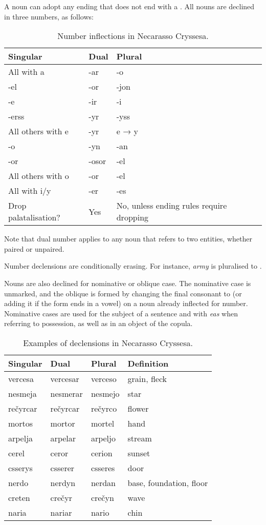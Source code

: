 \documentclass{book}
\begin{document}
A noun can adopt any ending that does not end with a . All nouns are declined in three numbers, as follows:

\begin{table}[H]
  \caption{Number inflections in Necarasso Cryssesa.}
  \centering
  \begin{tabu}{|X|X|X|}
    \hline
    Singular & Dual & Plural \\ \hline
    All with a & -ar & -o \\ \hline
    -el & -or & -jon \\
    -e & -ir & -i \\
    -erss & -yr & -yss \\
    All others with e & -yr & e → y \\ \hline
    -o & -yn & -an \\
    -or & -osor & -el \\
    All others with o & -or & -el \\ \hline
    All with i/y & -er & -es \\ \hline
   Drop palatalisation? & Yes & No, unless ending rules require dropping \\ \hline
  \end{tabu}
\end{table}

Note that dual number applies to any noun that refers to two entities, whether paired or unpaired.

Number declensions are conditionally erasing. For instance,  \emph{army} is pluralised to .

Nouns are also declined for nominative or oblique case. The nominative case is unmarked, and the oblique is formed by changing the final consonant to  (or adding it if the form ends in a vowel) on a noun already inflected for number. Nominative cases are used for the subject of a sentence and with \emph{eas} when referring to possession, as well as in an object of the copula.

\begin{table}[htb]
  \caption{Examples of declensions in Necarasso Cryssesa.}
  \centering
  \begin{tabular}{|l|l|l|l|}
    \hline
    Singular & Dual & Plural & Definition \\ \hline
    vercesa & vercesar & verceso & grain, fleck \\
    nesmeja & nesmerar & nesmejo & star \\
    rečyrcar & rečyrcar & rečyrco & flower \\
    mortos & mortor & mortel & hand \\
    arpelja & arpelar & arpeljo & stream \\
    cerel & ceror & cerion & sunset \\
    csserys & csserer & csseres & door \\
    nerdo & nerdyn & nerdan & base, foundation, floor \\
    creten & crečyr & crečyn & wave \\
    naria & nariar & nario & chin \\ \hline
  \end{tabular}
\end{table}
\end{document}
